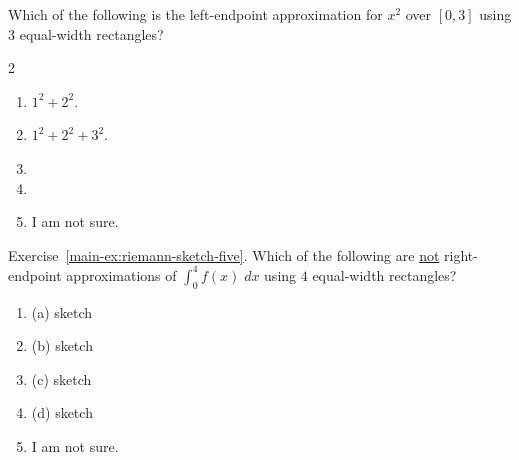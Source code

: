 \documentclass[aspectratio=169, 14pt, t]{beamer}  %
\begin{document}
\begin{poll}
  Which of the following is the left-endpoint approximation for \(x^{2}\) over \([0,3]\) using \(3\) equal-width rectangles?

  \begin{multicols}{2}
    \begin{enumerate}
      \item \(1^{2} + 2^{2}\).
      \item \(1^{2} + 2^{2} + 3^{2}\).
      \item
      \item
      \item I am not sure.
    \end{enumerate}
  \end{multicols}

  \pause
  \bigskip
  \begin{center}
  \end{center}
\end{poll}

\begin{poll}
  Exercise~\ref{main-ex:riemann-sketch-five}. Which of the following are \uline{not} right-endpoint approximations of \(\int_{0}^{4} f(x) \;dx\) using \(4\) equal-width rectangles?

  \begin{enumerate}
    \item (a) sketch
    \item (b) sketch
    \item (c) sketch
    \item (d) sketch
    \item I am not sure.
  \end{enumerate}
\end{poll}
\end{document}
